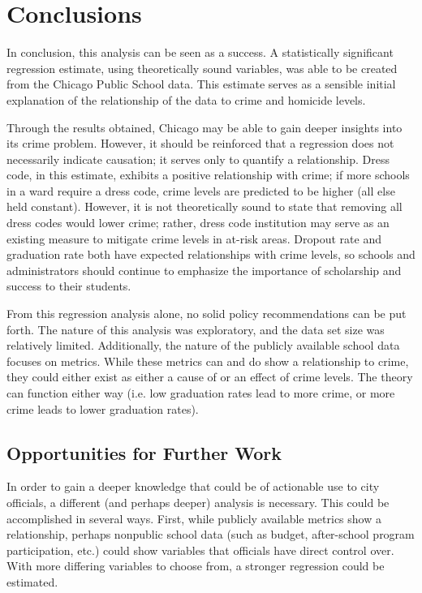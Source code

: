 \documentclass[12pt]{article}
\begin{document}
	\section{Conclusions}

In conclusion, this analysis can be seen as a success.  A statistically significant regression estimate, using theoretically sound variables, was able to be created from the Chicago Public School data.  This estimate serves as a sensible initial explanation of the relationship of the data to crime and homicide levels.

\par

Through the results obtained, Chicago may be able to gain deeper insights into its crime problem.  However, it should be reinforced that a regression does not necessarily indicate causation; it serves only to quantify a relationship.  Dress code, in this estimate, exhibits a positive relationship with crime; if more schools in a ward require a dress code, crime levels are predicted to be higher (all else held constant).  However, it is not theoretically sound to state that removing all dress codes would lower crime; rather, dress code institution may serve as an existing measure to mitigate crime levels in at-risk areas.  Dropout rate and graduation rate both have expected relationships with crime levels, so schools and administrators should continue to emphasize the importance of scholarship and success to their students.

\par

From this regression analysis alone, no solid policy recommendations can be put forth.  The nature of this analysis was exploratory, and the data set size was relatively limited.  Additionally, the nature of the publicly available school data focuses on metrics.  While these metrics can and do show a relationship to crime, they could either exist as either a cause of or an effect of crime levels.  The theory can function either way (i.e. low graduation rates lead to more crime, or more crime leads to lower graduation rates).  



\subsection{Opportunities for Further Work}

In order to gain a deeper knowledge that could be of actionable use to city officials, a different (and perhaps deeper) analysis is necessary.  This could be accomplished in several ways.  First, while publicly available metrics show a relationship, perhaps nonpublic school data (such as budget, after-school program participation, etc.) could show variables that officials have direct control over.  With more differing variables to choose from, a stronger regression could be estimated.
\end{document}
